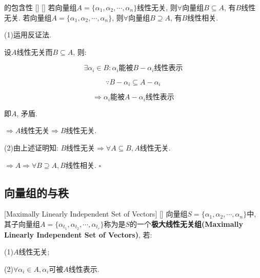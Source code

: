 \documentclass[UTF8]{ctexart}
\begin{document}
		\begin{ppt}
			[]
			{ 的包含性}
			[]
			[]
			若向量组$A=\{\alpha_{1}, \alpha_{2}, \cdots, \alpha_{n}\}$线性无关, 则$\forall$向量组$B\subseteq A$, 有$B$线性无关. 
			若向量组$A=\{\alpha_{1}, \alpha_{2}, \cdots, \alpha_{n}\}$, 则$\forall$向量组$B\supseteq A$, 有$B$线性相关. 
						
		\end{ppt}
		\begin{prf}
		
			(1)运用反证法. 
			
			设$A$线性无关而$B\subseteq A$, 则: 
			
			$$\exists \alpha_{i}\in B: \alpha_{i}\mbox{能被}B-\alpha_{i}\mbox{线性表示}$$
			
			$$\because B-\alpha_{i}\subseteq A-\alpha_{i}$$
			
			$$\Longrightarrow \alpha_{i}\mbox{能被}A-\alpha_{i}\mbox{线性表示}$$
			
			即$A$, 矛盾. 
			
			$\Longrightarrow A$线性无关$\Longrightarrow B$线性无关. 
			
			(2)由上述证明知: $B$线性无关$\Longrightarrow \forall A \subseteq B, A$线性无关. 
			
			$\Longrightarrow A$$\Longrightarrow \forall B \supseteq A, B$线性相关. $\square$
		\end{prf}
	\subsection{向量组的 与秩}
		
		\begin{dfn}
			{}
			[Maximally Linearly Independent Set of Vectors]
			[]
			向量组$S=\{\alpha_{1}, \alpha_{2}, \cdots, \alpha_{n}\}$中, 其子向量组$A=\{\alpha_{t_{1}}, \alpha_{t_{2}}, \cdots, \alpha_{t_{r}}\}$称为是$S$的一个\textbf{极大线性无关组(Maximally Linearly Independent Set of Vectors)}, 若: 
			
			(1)$A$线性无关; 
			
			(2)$\forall \alpha_{i}\in A, \alpha_{i}$可被$A$线性表示. 
		
		\end{dfn}
			
\end{document}
